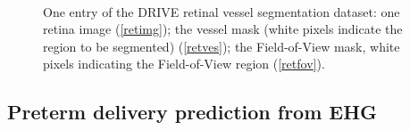 \documentclass[5p, final]{elsarticle}
\begin{document}
\begin{figure}[t]
\begin{center}
\\
\end{center}
\caption{One entry of the DRIVE retinal vessel segmentation dataset: one retina image (\ref{retimg}); the vessel mask (white pixels indicate the region to be segmented) (\ref{retves}); the Field-of-View mask, white pixels indicating the Field-of-View region (\ref{retfov}).}
\label{figretina}
\end{figure}
    
\subsection{Preterm delivery prediction from EHG}
\label{sec:ehg}
\end{document}
